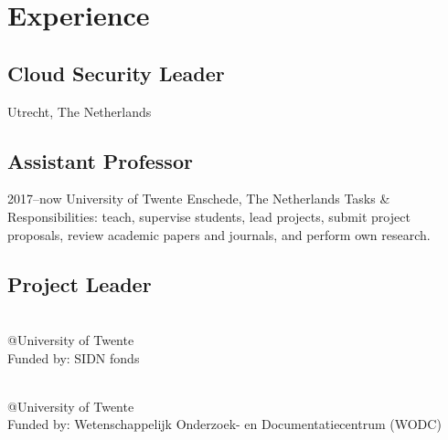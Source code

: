 \documentclass[print]{styles/friggeri-cv-linux} %
\begin{document}
\section{Experience}\vspace{-5pt}
\subsection{Cloud Security Leader}\vspace{-5pt}
\begin{entrylist}
{Utrecht, The Netherlands}
{}
\end{entrylist}
\subsection{Assistant Professor}\vspace{-5pt}
\begin{entrylist}
	\entry
	{2017--now}
	{University of Twente}
	{Enschede, The Netherlands}
	{Tasks \& Responsibilities: teach, supervise students, lead projects, submit project proposals, review academic papers and journals, and perform own research.} 
\end{entrylist}
\newpage
\subsection{Project Leader}\vspace{-5pt}
\begin{entrylist}

{\\@University of Twente\\Funded by: SIDN fonds}%
{}

{\\@University of Twente\\Funded by: Wetenschappelijk Onderzoek- en Documentatiecentrum (WODC)}%
{}
\end{entrylist}
\end{document}
